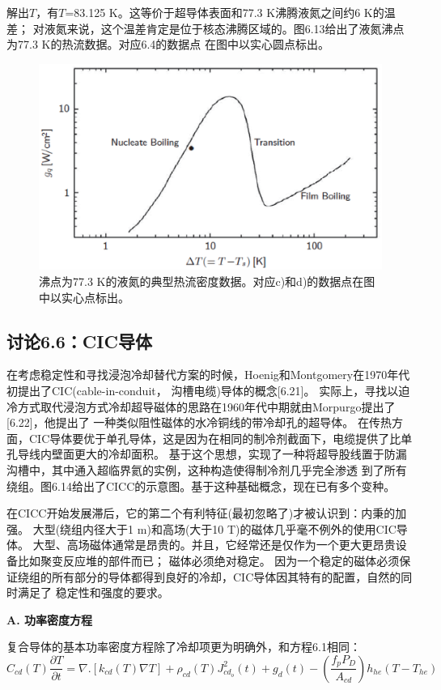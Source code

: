 解出$T$，有$T$=83.125 K。这等价于超导体表面和77.3 K沸腾液氮之间约6 K的温差；
对液氮来说，这个温差肯定是位于核态沸腾区域的。图6.13给出了液氮沸点为77.3 K的热流数据。对应6.4的数据点
在图中以实心圆点标出。
\begin{figure}[htbp]
	\centering
	\includegraphics[scale=0.6]{chpt6/figs/fig6.13.eps}
	\caption{沸点为77.3 K的液氮的典型热流密度数据。对应c)和d)的数据点在图中以实心点标出。}
\end{figure}

\subsection{讨论6.6：CIC导体}
在考虑稳定性和寻找浸泡冷却替代方案的时候，Hoenig和Montgomery在1970年代初提出了CIC(cable-in-conduit，
沟槽电缆)导体的概念[6.21]。
实际上，寻找以迫冷方式取代浸泡方式冷却超导磁体的思路在1960年代中期就由Morpurgo提出了[6.22]，他提出了
一种类似阻性磁体的水冷铜线的带冷却孔的超导体。
在传热方面，CIC导体要优于单孔导体，这是因为在相同的制冷剂截面下，电缆提供了比单孔导线内壁面更大的冷却面积。
基于这个思想，实现了一种将超导股线置于防漏沟槽中，其中通入超临界氦的实例，这种构造使得制冷剂几乎完全渗透
到了所有绕组。图6.14给出了CICC的示意图。基于这种基础概念，现在已有多个变种。

在CICC开始发展滞后，它的第二个有利特征(最初忽略了)才被认识到：内秉的加强。
大型(绕组内径大于1 m)和高场(大于10 T)的磁体几乎毫不例外的使用CIC导体。
大型、高场磁体通常是昂贵的。并且，它经常还是仅作为一个更大更昂贵设备比如聚变反应堆的部件而已；
磁体必须绝对稳定。
因为一个稳定的磁体必须保证绕组的所有部分的导体都得到良好的冷却，CIC导体因其特有的配置，自然的同时满足了
稳定性和强度的要求。

\textbf{A. 功率密度方程}

复合导体的基本功率密度方程除了冷却项更为明确外，和方程6.1相同：
\begin{equation}%
C_{cd}(T)\frac{\partial T}{\partial t}=\nabla.[k_{cd}(T)\nabla T]+\rho_{cd}(T)J_{cd_o}^2(t)+g_d(t)-(\frac{f_pP_D}{A_{cd}})h_{he}(T-T_{he})
\end{equation}

